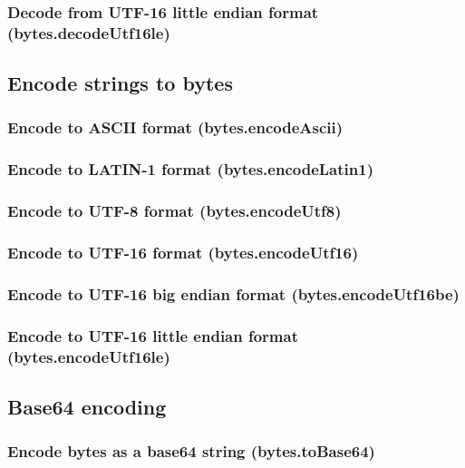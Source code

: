 \documentclass{article}
\theoremstyle{definition}
\begin{document}
\subsubsection{Decode from UTF-16 little endian format (bytes.decodeUtf16le)}

\subsection{Encode strings to bytes}

\subsubsection{Encode to ASCII format (bytes.encodeAscii)}

\subsubsection{Encode to LATIN-1 format (bytes.encodeLatin1)}

\subsubsection{Encode to UTF-8 format (bytes.encodeUtf8)}

\subsubsection{Encode to UTF-16 format (bytes.encodeUtf16)}

\subsubsection{Encode to UTF-16 big endian format (bytes.encodeUtf16be)}

\subsubsection{Encode to UTF-16 little endian format (bytes.encodeUtf16le)}

\subsection{Base64 encoding}

\subsubsection{Encode bytes as a base64 string (bytes.toBase64)}
\end{document}
